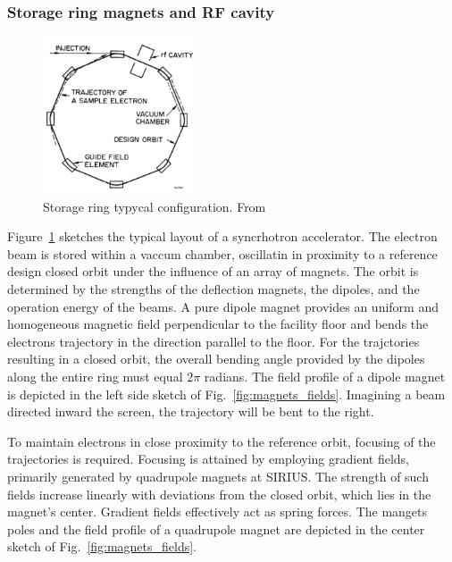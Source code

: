 \subsubsection{Storage ring magnets and RF cavity}
\begin{figure}[tb]
    \centering
    \includegraphics[width=0.4\textwidth]{Images/storage_ring.png}
    \caption{Storage ring typycal configuration. From \cite{sands_1969}}
    \label{fig:storage_ring}
\end{figure}
Figure~\ref{fig:storage_ring} sketches the typical layout of a syncrhotron accelerator. The electron beam is stored within a vaccum chamber, oscillatin in proximity to a reference design closed orbit under the influence of an array of magnets. The orbit is determined by the strengths of the deflection magnets, the dipoles, and the operation energy of the beams. A pure dipole magnet provides an uniform and homogeneous magnetic field perpendicular to the facility floor and bends the electrons trajectory in the direction parallel to the floor. For the trajctories resulting in a closed orbit, the overall bending angle provided by the dipoles along the entire ring must equal $2\pi$ radians. The field profile of a dipole magnet is depicted in the left side sketch of Fig.~\ref{fig:magnets_fields}. Imagining a beam directed inward the screen, the trajectory will be bent to the right.

To maintain electrons in close proximity to the reference orbit, focusing of the trajectories is required. Focusing is attained by employing gradient fields, primarily generated by quadrupole magnets at SIRIUS. The strength of such fields increase linearly with deviations from the closed orbit, which lies in the magnet's center. Gradient fields effectively act as spring forces. The mangets poles and the field profile of a quadrupole magnet are depicted in the center sketch of Fig.~\ref{fig:magnets_fields}.


